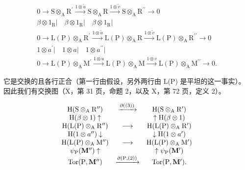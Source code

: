 \[
\begin{array}{c}0 \rightarrow \mathrm{S} \otimes_ {\mathrm{A}} \mathrm{R} ^ {\prime} \xrightarrow {1 \otimes \tilde {u}} \mathrm{S} \otimes_ {\mathrm{A}} \mathrm{R} \xrightarrow {1 \otimes \tilde {v}} \mathrm{S} \otimes_ {\mathrm{A}} \mathrm{R} ^ {\prime \prime} \longrightarrow 0\\\beta \otimes 1 _ {\mathrm{R}} \Bigg | \quad \beta \otimes 1 _ {\mathrm{R}} \Bigg | \quad \beta \otimes 1 _ {\mathrm{R}} \Bigg |\\0 \rightarrow \mathrm{L(P)} \otimes_ {\mathrm{A}} \mathrm{R} ^ {\prime} \xrightarrow {1 \otimes \tilde {u}} \mathrm{L(P)} \otimes_ {\mathrm{A}} \mathrm{R} \xrightarrow {1 \otimes \tilde {v}} \mathrm{L(P)} \otimes_ {\mathrm{A}} \mathrm{R} ^ {\prime \prime} \longrightarrow 0\\1 \otimes a ^ {\prime} \Bigg | \quad 1 \otimes a \Bigg | \quad 1 \otimes a ^ {\prime \prime} \Bigg |\\0 \rightarrow \mathrm{L(P)} \otimes_ {\mathrm{A}} \mathrm{M} ^ {\prime} \xrightarrow {1 \otimes u} \mathrm{L(P)} \otimes_ {\mathrm{A}} \mathrm{M} \xrightarrow {1 \otimes v} \mathrm{L(P)} \otimes_ {\mathrm{A}} \mathrm{M} ^ {\prime \prime} \longrightarrow 0.\end{array}
\]

它是交换的且各行正合（第一行由假设，另外两行由 L(P) 是平坦的这一事实）。因此我们有交换图（X，第 31 页，命题 2，以及 X，第 72 页，定义 2）。

\[
\begin{array}{c c c} \mathrm{H} (\mathrm{S} \otimes_ {\mathrm{A}} \mathrm{R} ^ {\prime \prime}) & \xrightarrow {\partial ((3))} & \mathrm{H} (\mathrm{S} \otimes_ {\mathrm{A}} \mathrm{R} ^ {\prime}) \\ \mathrm{H} (\beta \otimes 1) \uparrow & & \uparrow \mathrm{H} (\beta \otimes 1) \\ \mathrm{H} (\mathrm{L} (\mathrm{P}) \otimes_ {\mathrm{A}} \mathrm{R} ^ {\prime \prime}) & \longrightarrow & \mathrm{H} (\mathrm{L} (\mathrm{P}) \otimes_ {\mathrm{A}} \mathrm{R} ^ {\prime}) \\ \mathrm{H} (1 \otimes a ^ {\prime \prime}) \downarrow & & \downarrow \mathrm{H} (1 \otimes a ^ {\prime}) \\ \mathrm{H} (\mathrm{L} (\mathrm{P}) \otimes_ {\mathrm{A}} \mathrm{M} ^ {\prime \prime}) & \longrightarrow & \mathrm{H} (\mathrm{L} (\mathrm{P}) \otimes_ {\mathrm{A}} \mathrm{M} ^ {\prime}) \\ \psi_ {\mathrm{P}} (\mathbf {M} ^ {\prime \prime}) \uparrow & & \uparrow \psi_ {\mathrm{P}} (\mathbf {M} ^ {\prime}) \\ \operatorname{Tor} (\mathrm{P}, \mathbf {M} ^ {\prime \prime}) & \xrightarrow {\partial (\mathrm{P} , (2))} & \operatorname{Tor} (\mathrm{P}, \mathbf {M} ^ {\prime}). \end{array}
\]

